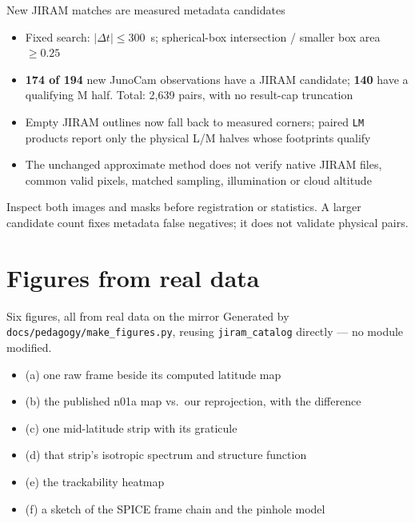 \documentclass[aspectratio=169,11pt]{beamer}
\newcommand{\currevsec}{}
\newcommand{\revsec}[1]{\gdef\currevsec{#1}}
\begin{document}
\begin{frame}{New JIRAM matches are measured metadata candidates}
  \revsec{4.19}
  \begin{itemize}
    \item Fixed search: $|\Delta t|\leq300$~s; spherical-box intersection / smaller box area $\geq0.25$
    \item \textbf{174 of 194} new JunoCam observations have a JIRAM candidate; \textbf{140} have a qualifying M half. Total: 2,639 pairs, with no result-cap truncation
    \item Empty JIRAM outlines now fall back to measured corners; paired \texttt{LM} products report only the physical L/M halves whose footprints qualify
    \item The unchanged approximate method does not verify native JIRAM files, common valid pixels, matched sampling, illumination or cloud altitude
  \end{itemize}
  \vspace{0.2cm}
  Inspect both images and masks before registration or statistics. A larger candidate count fixes metadata false negatives; it does not validate physical pairs.
\end{frame}

\section{Figures from real data}

\begin{frame}{Six figures, all from real data on the mirror}
  \revsec{4}
  Generated by \texttt{docs/pedagogy/make\_figures.py}, reusing \texttt{jiram\_catalog} directly --- no module modified.
  \begin{itemize}
    \item (a) one raw frame beside its computed latitude map
    \item (b) the published n01a map vs.\ our reprojection, with the difference
    \item (c) one mid-latitude strip with its graticule
    \item (d) that strip's isotropic spectrum and structure function
    \item (e) the trackability heatmap
    \item (f) a sketch of the SPICE frame chain and the pinhole model
  \end{itemize}
\end{frame}
\end{document}
